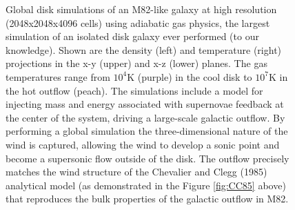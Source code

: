 \documentclass[11pt,letterpaper,english]{article}
\begin{document}
\begin{figure}[H]
\caption{Global disk simulations of an M82-like galaxy at high resolution (2048x2048x4096 cells) using adiabatic gas physics, the largest simulation of an isolated disk galaxy ever performed (to our knowledge). Shown are
the density (left) and temperature (right) projections in the x-y (upper) and x-z (lower) planes. The gas temperatures range from $10^{4}$K (purple) in the cool disk to $10^7$K in the hot outflow (peach). The simulations include a model for injecting mass and energy associated with supernovae feedback at the center
of the system, driving a large-scale galactic outflow.
By performing a global simulation the three-dimensional nature of the wind is captured, allowing the wind to
develop a sonic point and become a supersonic flow outside of the disk. The outflow precisely matches the
wind structure of the Chevalier and Clegg (1985) analytical model (as demonstrated in the  Figure \ref{fig:CC85} above) that reproduces the bulk properties of the galactic outflow in M82.}
\label{fig:adiabatic_2048}
\end{figure}
\end{document}
